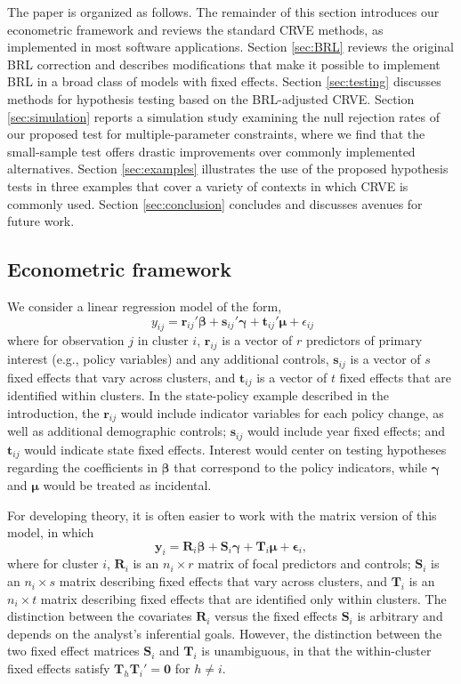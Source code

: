\documentclass[12pt]{article}
\newcommand{\bm}{\mathbf}
\newcommand{\bs}{\boldsymbol}
\begin{document}
The paper is organized as follows. The remainder of this section introduces our econometric framework and reviews the standard CRVE methods, as implemented in most software applications.
Section \ref{sec:BRL} reviews the original BRL correction and describes modifications that make it possible to implement BRL in a broad class of models with fixed effects.
Section \ref{sec:testing} discusses methods for hypothesis testing based on the BRL-adjusted CRVE. 
Section \ref{sec:simulation} reports a simulation study examining the null rejection rates of our proposed test for multiple-parameter constraints, where we find that the small-sample test offers drastic improvements over commonly implemented alternatives. 
Section \ref{sec:examples} illustrates the use of the proposed hypothesis tests in three examples that cover a variety of contexts in which CRVE is commonly used. 
Section \ref{sec:conclusion} concludes and discusses avenues for future work. 

\subsection{Econometric framework}

We consider a linear regression model of the form,
\begin{equation}
\label{eq:fixed_effects_ij}
\ {y}_{ij} = \bm{r}_{ij}' \bs\beta + \bm{s}_{ij}' \bs\gamma + \bm{t}_{ij}' \bs\mu + \epsilon_{ij} 
\end{equation}
where for observation $j$ in cluster $i$, $\bm{r}_{ij}$ is a vector of $r$ predictors of primary interest (e.g., policy variables) and any additional controls, $\bm{s}_{ij}$ is a vector of $s$ fixed effects that vary across clusters, and $\bm{t}_{ij}$ is a vector of $t$ fixed effects that are identified within clusters. In the state-policy example described in the introduction, the $\bm{r}_{ij}$ would include indicator variables for each policy change, as well as additional demographic controls; $\bm{s}_{ij}$ would include year fixed effects; and $\bm{t}_{ij}$ would indicate state fixed effects. Interest would center on testing hypotheses regarding the coefficients in $\bs\beta$ that correspond to the policy indicators, while $\bs\gamma$ and $\bs\mu$ would be treated as incidental. 

For developing theory, it is often easier to work with the matrix version of this model, in which
\begin{equation}
\label{eq:fixed_effects}
\bm{y}_i = \bm{R}_i \bs\beta + \bm{S}_i \bs\gamma + \bm{T}_i \bs\mu + \bs\epsilon_i,
\end{equation}
where for cluster $i$, $\bm{R}_i$ is an $n_i \times r$ matrix of focal predictors and controls; $\bm{S}_i$ is an $n_i \times s$ matrix describing fixed effects that vary across clusters, and $\bm{T}_i$ is an $n_i \times t$ matrix describing fixed effects that are identified only within clusters. The distinction between the covariates $\bm{R}_i$ versus the fixed effects $\bm{S}_i$ is arbitrary and depends on the analyst's inferential goals. However, the distinction between the two fixed effect matrices $\bm{S}_i$ and $\bm{T}_i$ is unambiguous, in that the within-cluster fixed effects satisfy $\bm{T}_h \bm{T}_i' = \bm{0}$ for $h \neq i$. 
\end{document}
